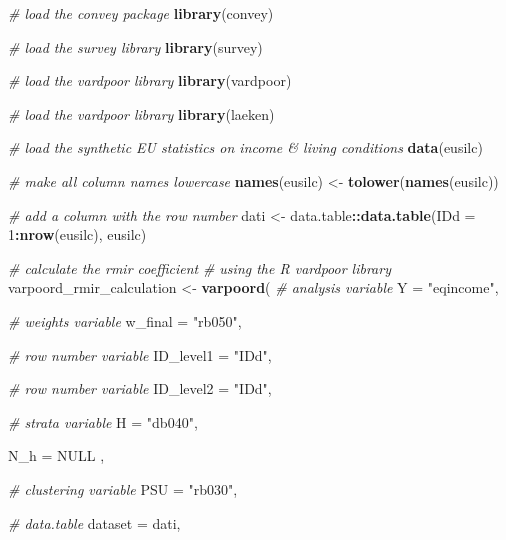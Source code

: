 \documentclass[
]{book}
\newenvironment{Shaded}{\begin{snugshade}}{\end{snugshade}}
\newcommand{\AttributeTok}[1]{\textcolor[rgb]{0.13,0.29,0.53}{#1}}
\newcommand{\CommentTok}[1]{\textcolor[rgb]{0.56,0.35,0.01}{\textit{#1}}}
\newcommand{\ConstantTok}[1]{\textcolor[rgb]{0.56,0.35,0.01}{#1}}
\newcommand{\DecValTok}[1]{\textcolor[rgb]{0.00,0.00,0.81}{#1}}
\newcommand{\FunctionTok}[1]{\textcolor[rgb]{0.13,0.29,0.53}{\textbf{#1}}}
\newcommand{\NormalTok}[1]{#1}
\newcommand{\OtherTok}[1]{\textcolor[rgb]{0.56,0.35,0.01}{#1}}
\newcommand{\SpecialCharTok}[1]{\textcolor[rgb]{0.81,0.36,0.00}{\textbf{#1}}}
\newcommand{\StringTok}[1]{\textcolor[rgb]{0.31,0.60,0.02}{#1}}
\begin{document}
\begin{Shaded}
\begin{Highlighting}[]
\CommentTok{\# load the convey package}
\FunctionTok{library}\NormalTok{(convey)}

\CommentTok{\# load the survey library}
\FunctionTok{library}\NormalTok{(survey)}

\CommentTok{\# load the vardpoor library}
\FunctionTok{library}\NormalTok{(vardpoor)}

\CommentTok{\# load the vardpoor library}
\FunctionTok{library}\NormalTok{(laeken)}

\CommentTok{\# load the synthetic EU statistics on income \& living conditions}
\FunctionTok{data}\NormalTok{(eusilc)}

\CommentTok{\# make all column names lowercase}
\FunctionTok{names}\NormalTok{(eusilc) }\OtherTok{\textless{}{-}} \FunctionTok{tolower}\NormalTok{(}\FunctionTok{names}\NormalTok{(eusilc))}

\CommentTok{\# add a column with the row number}
\NormalTok{dati }\OtherTok{\textless{}{-}}\NormalTok{ data.table}\SpecialCharTok{::}\FunctionTok{data.table}\NormalTok{(}\AttributeTok{IDd =} \DecValTok{1}\SpecialCharTok{:}\FunctionTok{nrow}\NormalTok{(eusilc), eusilc)}

\CommentTok{\# calculate the rmir coefficient}
\CommentTok{\# using the R vardpoor library}
\NormalTok{varpoord\_rmir\_calculation }\OtherTok{\textless{}{-}}
  \FunctionTok{varpoord}\NormalTok{(}
    \CommentTok{\# analysis variable}
    \AttributeTok{Y =} \StringTok{"eqincome"}\NormalTok{,}
    
    \CommentTok{\# weights variable}
    \AttributeTok{w\_final =} \StringTok{"rb050"}\NormalTok{,}
    
    \CommentTok{\# row number variable}
    \AttributeTok{ID\_level1 =} \StringTok{"IDd"}\NormalTok{,}
    
    \CommentTok{\# row number variable}
    \AttributeTok{ID\_level2 =} \StringTok{"IDd"}\NormalTok{,}
    
    \CommentTok{\# strata variable}
    \AttributeTok{H =} \StringTok{"db040"}\NormalTok{,}
    
    \AttributeTok{N\_h =} \ConstantTok{NULL}\NormalTok{ ,}
    
    \CommentTok{\# clustering variable}
    \AttributeTok{PSU =} \StringTok{"rb030"}\NormalTok{,}
    
    \CommentTok{\# data.table}
    \AttributeTok{dataset =}\NormalTok{ dati,}
    

\end{Highlighting}
\end{Shaded}
\end{document}
